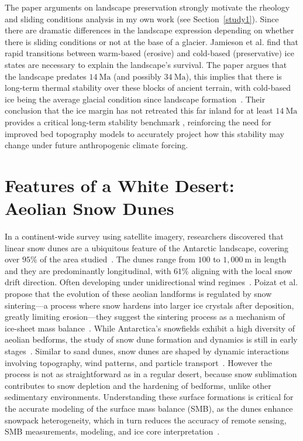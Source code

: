 The paper arguments on landscape preservation strongly motivate the rheology and sliding conditions analysis in my own work (see Section~\ref{study1}). Since there are dramatic differences in the landscape expression depending on whether there is sliding conditions or not at the base of a glacier. Jamieson et al. find that rapid transitions between warm-based (erosive) and cold-based (preservative) ice states are necessary to explain the landscape's survival. The paper argues that the landscape predates $14~\mathrm{Ma}$ (and possibly $34~\mathrm{Ma}$), this implies that there is long-term thermal stability over these blocks of ancient terrain, with cold-based ice being the average glacial condition since landscape formation~\cite{Jamieson_2023}.  Their conclusion that the ice margin has not retreated this far inland for at least $14~\mathrm{Ma}$ provides a critical long-term stability benchmark , reinforcing the need for improved bed topography models to accurately project how this stability may change under future anthropogenic climate forcing.

\section{Features of a White Desert: Aeolian Snow Dunes}\label{Aeolian_dunes}
In a continent-wide survey using satellite imagery, researchers discovered that linear snow dunes are a ubiquitous feature of the Antarctic landscape, covering over $95\%$ of the area studied~\cite{Poizat_2024}.
The dunes range from $100$ to $1,000~\mathrm{m}$ in length~\cite{Poizat_2024} and they are predominantly longitudinal, with $61\%$ aligning with the local snow drift direction. Often developing under unidirectional wind regimes~\cite{Poizat_2024}. Poizat et al. propose that the evolution of these aeolian landforms is regulated by snow sintering—a process where snow hardens into larger ice crystals after deposition, greatly limiting erosion—they suggest the  sintering process as a mechanism of ice-sheet mass balance~\cite{Poizat_2024}.
While Antarctica's snowfields exhibit a high diversity of aeolian bedforms, the study of snow dune formation and dynamics is still in early stages~\cite{Poizat_2024}. Similar to sand dunes, snow dunes are shaped by dynamic interactions involving topography, wind patterns, and particle transport~\cite{Poizat_2024}. However the process is not as straightforward as in a regular desert, because snow sublimation contributes to snow depletion and the hardening of bedforms, unlike other sedimentary environments. Understanding these surface formations is critical for the accurate modeling of the surface mass balance (SMB), as the dunes enhance snowpack heterogeneity, which in turn reduces the accuracy of remote sensing, SMB measurements, modeling, and ice core interpretation~\cite{Poizat_2024}.

